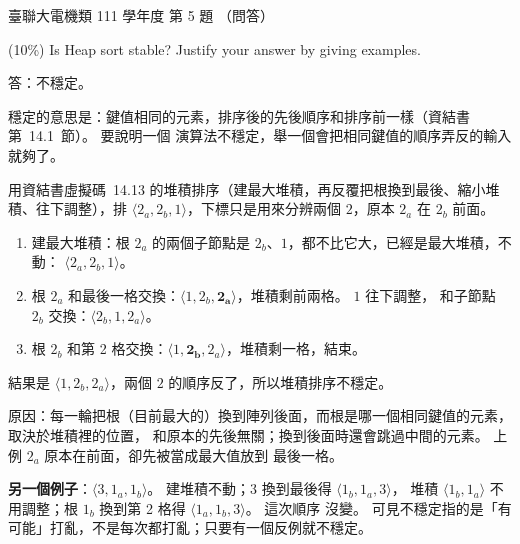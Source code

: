 \begin{pastexam}[label={px:ust-111-ee-ds-05}]{臺聯大電機類 111 學年度 第 5 題}
（問答）

(10\%) Is Heap sort stable? Justify your answer by giving examples.
\end{pastexam}

\begin{pastsoln}
答：不穩定。

穩定的意思是：鍵值相同的元素，排序後的先後順序和排序前一樣（資結書第~14.1~節）。 要說明一個
演算法不穩定，舉一個會把相同鍵值的順序弄反的輸入就夠了。

用資結書虛擬碼~14.13 的堆積排序（建最大堆積，再反覆把根換到最後、縮小堆積、往下調整），排
$\langle 2_a, 2_b, 1 \rangle$，下標只是用來分辨兩個 $2$，原本 $2_a$ 在 $2_b$ 前面。
\begin{enumerate}
\item 建最大堆積：根 $2_a$ 的兩個子節點是 $2_b$、$1$，都不比它大，已經是最大堆積，不動：
$\langle 2_a, 2_b, 1 \rangle$。
\item 根 $2_a$ 和最後一格交換：$\langle 1, 2_b, \mathbf{2_a} \rangle$，堆積剩前兩格。 $1$ 往下調整，
和子節點 $2_b$ 交換：$\langle 2_b, 1, 2_a \rangle$。
\item 根 $2_b$ 和第 2 格交換：$\langle 1, \mathbf{2_b}, 2_a \rangle$，堆積剩一格，結束。
\end{enumerate}
結果是 $\langle 1, 2_b, 2_a \rangle$，兩個 $2$ 的順序反了，所以堆積排序不穩定。

原因：每一輪把根（目前最大的）換到陣列後面，而根是哪一個相同鍵值的元素，取決於堆積裡的位置，
和原本的先後無關；換到後面時還會跳過中間的元素。 上例 $2_a$ 原本在前面，卻先被當成最大值放到
最後一格。

\textbf{另一個例子}：$\langle 3, 1_a, 1_b \rangle$。 建堆積不動；$3$ 換到最後得 $\langle 1_b, 1_a, 3 \rangle$，
堆積 $\langle 1_b, 1_a \rangle$ 不用調整；根 $1_b$ 換到第 2 格得 $\langle 1_a, 1_b, 3 \rangle$。 這次順序
沒變。 可見不穩定指的是「有可能」打亂，不是每次都打亂；只要有一個反例就不穩定。
\end{pastsoln}
